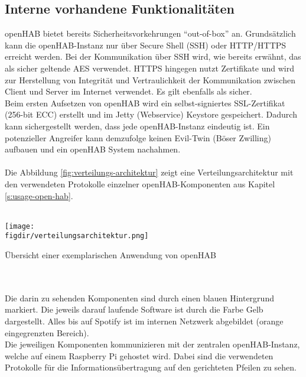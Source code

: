 \subsection{Interne vorhandene Funktionalitäten}
openHAB bietet bereits Sicherheitsvorkehrungen "`out-of-box"' an. Grundsätzlich kann die openHAB-Instanz nur über Secure Shell (SSH) oder HTTP/HTTPS erreicht werden. Bei der Kommunikation über SSH wird, wie bereits erwähnt, das als sicher geltende AES verwendet. HTTPS hingegen nutzt Zertifikate und wird zur Herstellung von Integrität und Vertraulichkeit der Kommunikation zwischen Client und Server im Internet verwendet. Es gilt ebenfalls als sicher.\\
Beim ersten Aufsetzen von openHAB wird ein selbst-signiertes SSL-Zertifikat (256-bit ECC) erstellt und im Jetty (Webservice) Keystore gespeichert. Dadurch kann sichergestellt werden, dass jede openHAB-Instanz eindeutig ist. Ein potenzieller Angreifer kann demzufolge keinen Evil-Twin (Böser Zwilling) aufbauen und ein openHAB System nachahmen.\\
\\
Die Abbildung \ref{fig:verteilungs-architektur} zeigt eine Verteilungsarchitektur mit den verwendeten Protokolle einzelner openHAB-Komponenten aus Kapitel \ref{s:usage-open-hab}.\\
\\
\begin{minipage}{\textwidth}
	\centering
	\captionsetup{type=figure}
	\texttt{[image: \\figdir/verteilungsarchitektur.png]}
	\caption{Übersicht einer exemplarischen Anwendung von openHAB \label{fig:verteilungs-architektur}}
\end{minipage}
\\
\\
Die darin zu sehenden Komponenten sind durch einen blauen Hintergrund markiert. Die jeweils darauf laufende Software ist durch die Farbe Gelb dargestellt. Alles bis auf Spotify ist im internen Netzwerk abgebildet (orange eingegrenzten Bereich).\\
Die jeweiligen Komponenten kommunizieren mit der zentralen openHAB-Instanz, welche auf einem Raspberry Pi gehostet wird. Dabei sind die verwendeten Protokolle für die Informationsübertragung auf den gerichteten Pfeilen zu sehen.

